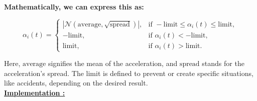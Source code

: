 \documentclass{article}
\begin{document}
			\textbf{Mathematically, we can express this as:}
		
			
			\[
			\alpha_i(t) =
			\begin{cases}
				\left| \mathcal{N}(\text{average}, \sqrt{\text{spread}}) \right|, & \text{if } -\text{limit} \leq \alpha_i(t) \leq \text{limit}, \\
				-\text{limit}, & \text{if } \alpha_i(t) < -\text{limit}, \\
				\text{limit}, & \text{if } \alpha_i(t) > \text{limit}.
			\end{cases}
			\]
			
			Here, \( \text{average} \) signifies the mean of the acceleration, and \( \text{spread} \) stands for the acceleration's spread. The limit is defined to prevent or create specific situations, like accidents, depending on the desired result. \\
			
			
			\textbf{\underline{Implementation : }}
			
\end{document}
